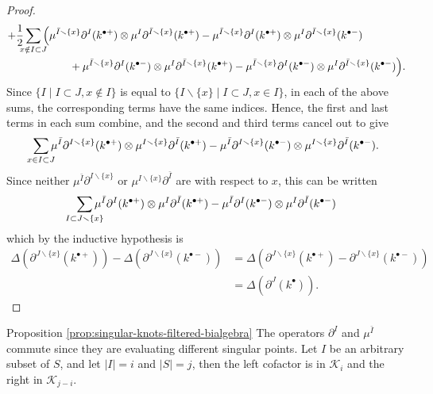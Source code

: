 \begin{proof}
\begin{align*}
		+
		& \frac{1}{2} \sum_{\mathclap{x \notin I \subset J}}
			\Big(
				\mu^{\bar{I} \smallsetminus \{x\}}\partial^{I}(k^{\bullet +})
				\otimes
				\mu^{I}\partial^{\bar{I} \smallsetminus \{x\}}(k^{\bullet +})
				-
				\mu^{\bar{I} \smallsetminus \{x\}}\partial^{I}(k^{\bullet +})
				\otimes
				\mu^{I}\partial^{\bar{I} \smallsetminus \{x\}}(k^{\bullet -}) \\
				& \qquad \qquad \quad +
				\mu^{\bar{I} \smallsetminus \{x\}}\partial^{I}(k^{\bullet -})
				\otimes
				\mu^{I}\partial^{\bar{I} \smallsetminus \{x\}}(k^{\bullet +})
				-
				\mu^{\bar{I} \smallsetminus \{x\}}\partial^{I}(k^{\bullet -})
				\otimes
				\mu^{I}\partial^{\bar{I} \smallsetminus \{x\}}(k^{\bullet -})
			\Big).
	\end{align*}
	Since \(\{I \mid I \subset J, x \notin I\}\) is equal to \(\{I \smallsetminus \{x\} \mid I \subset J, x \in I\}\), in each of the above sums, the corresponding terms have the same indices. Hence, the first and last terms in each sum combine, and the second and third terms cancel out to give
	\[
		\sum_{\mathclap{x \in I \subset J}}
			\mu^{\bar{I}}\partial^{I \smallsetminus \{x\}}(k^{\bullet +})
			\otimes
			\mu^{I \smallsetminus \{x\}}\partial^{\bar{I}}(k^{\bullet +})
		-
			\mu^{\bar{I}}\partial^{I \smallsetminus \{x\}}(k^{\bullet -})
			\otimes
			\mu^{I \smallsetminus \{x\}}\partial^{\bar{I}}(k^{\bullet -}).
	\]
	Since neither \(\mu^{\bar{I}}\partial^{I \smallsetminus \{x\}}\) or \(\mu^{I \smallsetminus \{x\}}\partial^{\bar{I}}\) are with respect to \(x\), this can be written
	\[
		\sum_{\mathclap{I \subset J \smallsetminus \{x\}}}
			\mu^{\bar{I}}\partial^{I}(k^{\bullet +})
			\otimes
			\mu^{I}\partial^{\bar{I}}(k^{\bullet +})
		-
			\mu^{\bar{I}}\partial^{I}(k^{\bullet -})
			\otimes
			\mu^{I}\partial^{\bar{I}}(k^{\bullet -})
	\]
	which by the inductive hypothesis is
	\begin{align*}
		\Delta(\partial^{J \smallsetminus \{x\}}(k^{\bullet +})) - \Delta(\partial^{J \smallsetminus \{x\}}(k^{\bullet -}))
		& = \Delta(\partial^{J \smallsetminus \{x\}}(k^{\bullet +}) - \partial^{J \smallsetminus \{x\}}(k^{\bullet -})) \\
		& = \Delta(\partial^{J}(k^{\bullet})).
	\end{align*}
\end{proof}

\begin{proofof}{Proposition \ref{prop:singular-knots-filtered-bialgebra}}
	The operators \(\partial^{I}\) and \(\mu^{\bar{I}}\) commute since they are evaluating different singular points. Let \(I\) be an arbitrary subset of \(S\), and let \(|I| = i\) and \(|S| = j\), then the left cofactor is in \(\mathcal{K}_{i}\) and the right in \(\mathcal{K}_{j - i}\).
\end{proofof}


